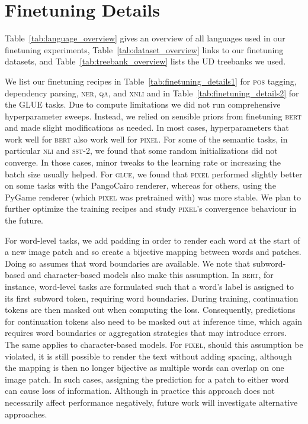 \documentclass{article}
\newcommand{\model}{\textsc{pixel}\xspace}
\begin{document}
\section{Finetuning Details}
\label{app:finetuning_details}
Table~\ref{tab:language_overview} gives an overview of all languages used in our finetuning experiments, Table~\ref{tab:dataset_overview} links to our finetuning datasets, and Table~\ref{tab:treebank_overview} lists the UD treebanks we used.

We list our finetuning recipes in Table~\ref{tab:finetuning_details1} for \textsc{pos} tagging, dependency parsing, \textsc{ner}, \textsc{qa}, and \textsc{xnli} and in Table~\ref{tab:finetuning_details2} for the GLUE tasks. Due to compute limitations we did not run comprehensive hyperparameter sweeps. Instead, we relied on sensible priors from finetuning \textsc{bert} and made slight modifications as needed. In most cases, hyperparameters that work well for \textsc{bert} also work well for \model. For some of the semantic tasks, in particular \textsc{nli} and \textsc{sst-}{\footnotesize2}, we found that some random initializations did not converge. In those cases, minor tweaks to the learning rate or increasing the batch size usually helped. For \textsc{glue}, we found that \model performed slightly better on some tasks with the PangoCairo renderer, whereas for others, using the PyGame renderer (which \model was pretrained with) was more stable. We plan to further optimize the training recipes and study \model's convergence behaviour in the future. 

For word-level tasks, we add padding in order to render each word at the start of a new image patch and so create a bijective mapping between words and patches.
Doing so assumes that word boundaries are available. We note that subword-based and character-based models also make this assumption. In \textsc{bert}, for instance, word-level tasks are formulated such that a word's label is assigned to its first subword token, requiring word boundaries. During training, continuation tokens are then masked out when computing the loss. Consequently, predictions for continuation tokens also need to be masked out at inference time, which again requires word boundaries or aggregation strategies that may introduce errors. The same applies to character-based models. For \model, should this assumption be violated, it is still possible to render the text without adding spacing, although the mapping is then no longer bijective as multiple words can overlap on one image patch. In such cases, assigning the prediction for a patch to either word can cause loss of information. Although in practice this approach does not necessarily affect performance negatively, future work will investigate alternative approaches.
\end{document}
